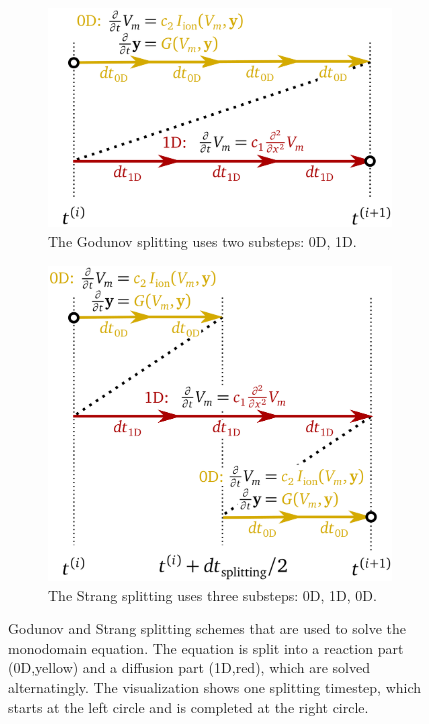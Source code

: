 \begin{figure}%
  \centering%
  \begin{subfigure}[t]{0.48\textwidth}%
    \centering%
    \def\svgwidth{\textwidth}
    \includegraphics[width=\textwidth]{images/theory/godunov_splitting.pdf}
    \caption{The Godunov splitting uses two substeps: 0D, 1D.}%
    \label{fig:godunov_splitting}%
  \end{subfigure}
  \quad
  \begin{subfigure}[t]{0.48\textwidth}%
    \centering%
    \includegraphics[width=\textwidth]{images/theory/strang_splitting.pdf}
    \caption{The Strang splitting uses three substeps: 0D, 1D, 0D.}%
    \label{fig:strang_splitting}%
  \end{subfigure}
  \caption{Godunov and Strang splitting schemes that are used to solve the monodomain equation. The equation is split into a reaction part (0D,yellow) and a diffusion part (1D,red), which are solved alternatingly. The visualization shows one splitting timestep, which starts at the left circle and is completed at the right circle.}%
  \label{fig:splitting_schemes}%
\end{figure}%

